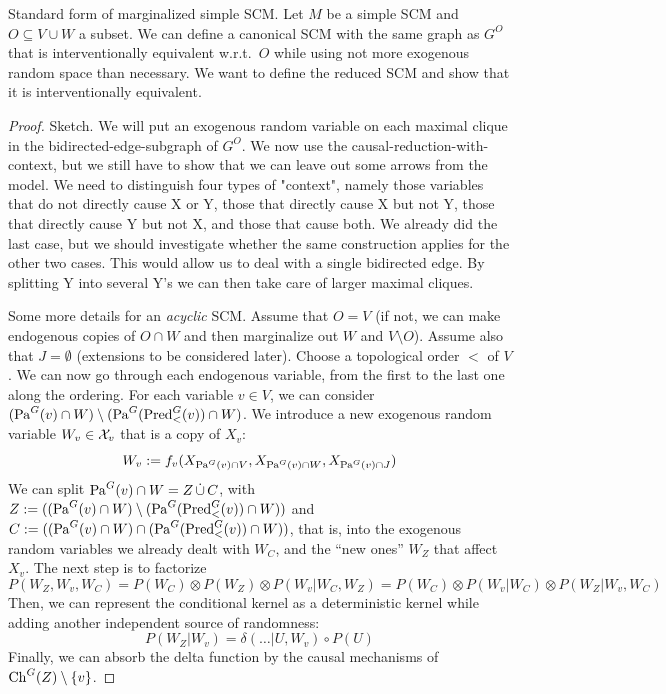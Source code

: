\begin{Def}
   Standard form of marginalized simple SCM. Let $M$ be a simple SCM and $O \subseteq V \cup W$ a subset.
  We can define a canonical SCM with the same graph as $G^{O}$ that is interventionally equivalent w.r.t.\ $O$ while
  using not more exogenous random space than necessary.
  We want to define the reduced SCM and show that it is interventionally equivalent.
\end{Def}
\begin{proof}
  Sketch. We will put an exogenous random variable on each maximal clique in the bidirected-edge-subgraph of $G^O$.
  We now use the causal-reduction-with-context, but we still have to show that we can leave out some arrows from 
  the model. We need to distinguish four types of "context", namely those variables that do not directly cause X
  or Y, those that directly cause X but not Y, those that directly cause Y but not X, and those that cause both.
  We already did the last case, but we should investigate whether the same construction applies for the other two cases.
  This would allow us to deal with a single bidirected edge. By splitting Y into several Y's we can then take care of
  larger maximal cliques.

  Some more details for an \emph{acyclic} SCM. Assume that $O = V$ (if not, we can make endogenous copies of $O \cap W$ and then
  marginalize out $W$ and $V \setminus O$). Assume also that $J = \emptyset$ (extensions to be considered later).
  Choose a topological order $<$ of $V$.
  We can now go through each endogenous variable, from the first to the last one along the ordering.
  For each variable $v \in V$, we can consider $(\mathrm{Pa}^G(v) \cap W) \setminus (\mathrm{Pa}^G(\mathrm{Pred}_<^G(v)) \cap W)$. 
  We introduce a new exogenous random variable $W_v \in \mathcal{X}_v$ that is a copy of $X_v$:
  $$W_v := f_v(X_{\mathrm{Pa}^G(v) \cap V}, X_{\mathrm{Pa}^G(v) \cap W}, X_{\mathrm{Pa}^G(v) \cap J})$$
  We can split $\mathrm{Pa}^G(v) \cap W = Z \,\dot{\cup}\, C$, 
  with $Z := ((\mathrm{Pa}^G(v) \cap W) \setminus (\mathrm{Pa}^G(\mathrm{Pred}_<^G(v)) \cap W))$ and $C := ((\mathrm{Pa}^G(v) \cap W) \cap (\mathrm{Pa}^G(\mathrm{Pred}_<^G(v)) \cap W))$,
  that is, into the exogenous random variables we already dealt with $W_C$, and the ``new ones'' $W_Z$ that affect $X_v$.
  The next step is to factorize 
  $$P(W_Z, W_v, W_C) = P(W_C) \otimes P(W_Z) \otimes P(W_v | W_C, W_Z) = P(W_C) \otimes P(W_v | W_C) \otimes P(W_Z | W_v,W_C)$$
  Then, we can represent the conditional kernel as a deterministic kernel while adding another independent source of randomness:
  \begin{equation*}
    P(W_Z | W_v) = \delta(\dots|U,W_v) \circ P(U) 
  \end{equation*}
  Finally, we can absorb the delta function by the causal mechanisms of $\mathrm{Ch}^G(Z) \setminus \{v\}$.


\end{proof}
